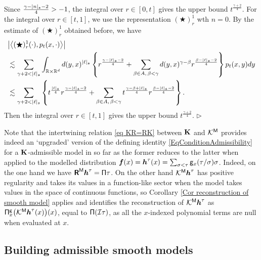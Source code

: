 \documentclass[10pt, reqno]{amsart}
\numberwithin{subsection}{section}
\numberwithin{subsubsection}{subsection}
\numberwithin{equation}{section} %
\newenvironment{Dem}[1][\unskip]{%
    \begin{list}{\hspace{1.15cm}{\sf \textbf{{\small Proof #1 --}}}}{%
        \setlength{\topsep}{0pt}%
        \setlength{\leftmargin}{0pt}%
        \setlength{\rightmargin}{0pt}%
        \setlength{\listparindent}{0pt}%
        \setlength{\itemindent}{0pt}%
        \setlength{\parsep}{0pt}%
        \addtolength{\leftmargin}{0pt}%
        \addtolength{\rightmargin}{0pt}%
    } \item }{\hfill $\rhd$\end{list}\smallskip}
\theoremstyle{mystyle}
\theoremstyle{mystyle2}
\theoremstyle{mystyle3}
\newcommand{\bsf}{\boldsymbol{f}}
\newcommand{\bsh}{\boldsymbol{h}}
\newcommand\bbR{\mathbb{R}}
\newcommand{\mcI}{\mathcal{I}}
\newcommand{\mcK}{\mathcal{K}}
\begin{document}
\begin{Dem}[of Theorem \ref{thm wellposedness of K}]
{\begin{align*}
\end{align*}
Since $\frac{\gamma-|n|_{\frak{s}}-2}4>-1$, the integral over $r\in[0,t]$ gives the upper bound $t^{\frac{\gamma+2}4}$. For the integral over $r\in[t,1]$, we use the representation $(\bigstar)^1_r$ wth $n=0$. By the estimate of $(\bigstar)^1_r$ obtained before, we have
\begin{align*}
&\big\vert\big\langle (\bigstar)^1_r(\cdot),p_t(x,\cdot)\big\rangle\big\vert\\
&\lesssim\sum_{\gamma+2< |\ell|_{\frak{s}} }
\int_{\bbR\times\bbR^d}d(y,x)^{|\ell|_{\frak{s}}}\left\{r^{\frac{\gamma-|\ell|_{\frak{s}}-2}{4}}
+\sum_{\beta\in A,\,\beta<\gamma} d(y,x)^{\gamma-\beta} r^{\frac{\beta-|\ell|_{\frak{s}}-2}{4}}\right\} p_t(x,y)dy\\
&\lesssim\sum_{\gamma+2< |\ell|_{\frak{s}} }
\left\{t^{\frac{|\ell|_{\frak{s}}}4}r^{\frac{\gamma-|\ell|_{\frak{s}}-2}{4}}
+\sum_{\beta\in A,\,\beta<\gamma} t^{\frac{\gamma-\beta+|\ell|_{\frak{s}}}4} r^{\frac{\beta-|\ell|_{\frak{s}}-2}{4}}\right\}.
\end{align*}
Then the integral over $r\in[t,1]$ gives the upper bound $t^{\frac{\gamma+2}4}$.
}
\end{Dem}

\medskip

Note that the intertwining relation \eqref{eq KR=RK} between $\bf K$ and $\mcK^{\sf M}$ provides indeed an `upgraded' version of the defining identity \eqref{EqConditionAdmissibility} for a $\bf K$-admissible model in 
so far as the former reduces to the latter when applied to the modelled distribution $\bsf(x) = \bsh^{\tau}(x) = \sum_{\sigma<\tau}{\sf g}_x(\tau/\sigma)\sigma$. Indeed, on the one hand we have $\textbf{\textsf{R}}^{\sf M}\bsh^{\tau} = {\sf \Pi}\tau$. On the other hand $\mcK^{\sf M}\bsh^\tau$ has positive regularity and takes its values in a function-like sector when the model takes values in the space of continuous functions, so Corollary \ref{Cor reconstruction of smooth model} applies and identifies the reconstruction of $\mcK^{\sf M}\bsh^\tau$ as ${\sf \Pi}^{\sf g}_x\big(\mcK^{\sf M}\bsh^\tau(x)\big)(x)$, equal to ${\sf \Pi}(\mcI\tau)$, as all the $x$-indexed polynomial terms are null  when evaluated at $x$. 

\bigskip



\subsection{Building admissible smooth models}
\label{SubsectionAdmissibleModels}
\end{document}
